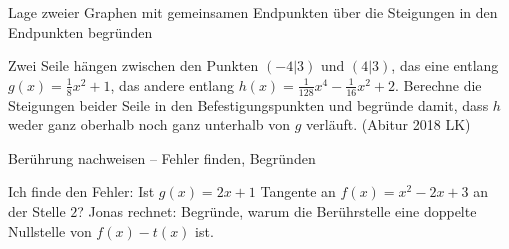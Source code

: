 \begin{aufgabe}{Lage zweier Graphen mit gemeinsamen Endpunkten über die Steigungen in den Endpunkten begründen}
\begin{teile}
\teil Zwei Seile hängen zwischen den Punkten $(-4 | 3)$ und $(4 | 3)$, das eine entlang $g(x) = \frac{1}{8}x^2 + 1$, das andere entlang $h(x) = \frac{1}{128}x^4 - \frac{1}{16}x^2 + 2$. Berechne die Steigungen beider Seile in den Befestigungspunkten und begründe damit, dass $h$ weder ganz oberhalb noch ganz unterhalb von $g$ verläuft. \hfill (Abitur 2018 LK)
\end{teile}
\end{aufgabe}

\begin{aufgabe}{Berührung nachweisen – Fehler finden, Begründen}
\begin{teile}
\teil Ich finde den Fehler: Ist $g(x) = 2x + 1$ Tangente an $f(x) = x^2 - 2x + 3$ an der Stelle $2$? Jonas rechnet: 
\teil Begründe, warum die Berührstelle eine doppelte Nullstelle von $f(x) - t(x)$ ist.
\end{teile}
\end{aufgabe}

